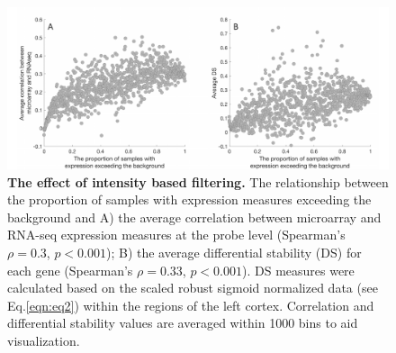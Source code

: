 \begin{figure}[h!]
  \centering
    \includegraphics[width=1\textwidth]{Chapter4/FigureS2.pdf}
\caption{\textbf{The effect of intensity based filtering.}
The relationship between the proportion of samples with expression measures exceeding the background and A) the average correlation between microarray and RNA-seq expression measures at the probe level (Spearman’s $\rho = 0.3$, $p<0.001$); B) the average differential stability (DS) for each gene (Spearman’s $\rho = 0.33$, $p<0.001$). DS measures were calculated based on the scaled robust sigmoid normalized data (see Eq.\ref{eqn:eq2}) within the regions of the left cortex. Correlation and differential stability values are averaged within 1000 bins to aid visualization.}
\label{fig:Ch4Sfig2}
\end{figure}

